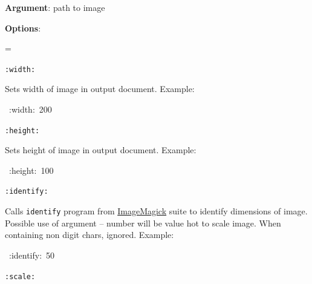\documentclass[12pt]{article}
\newenvironment{deflist}[1]{%
\begin{list}{}
{\renewcommand{\makelabel}[1]{\textbf{##1}\hfill}
\settowidth{\labelwidth}{\textbf{#1}}
\leftmargin=\labelwidth
\advance \leftmargin\labelsep}}
{\end{list}}
\begin{document}
\begin{itemize}
\item
\textbf{Argument}: path to image

\item
\textbf{Options}:

 \begin{deflist}{iii}

\item[ \texttt{:width:}]

Sets width of image in output document. Example:

\begin{ttfamily}\begin{flushleft}
\mbox{~:width:~200}\\
\end{flushleft}\end{ttfamily}

\item[ \texttt{:height:}]

Sets height of image in output document. Example:

\begin{ttfamily}\begin{flushleft}
\mbox{~:height:~100}\\
\end{flushleft}\end{ttfamily}

\item[ \texttt{:identify:}]

Calls \texttt{identify} program from \href{http://www.imagemagick.org}{ImageMagick} suite to identify
dimensions of image. Possible use of argument -- number will be value
hot to scale image. When containing non digit chars, ignored.
Example:

\begin{ttfamily}\begin{flushleft}
\mbox{~:identify:~50}\\
\end{flushleft}\end{ttfamily}

 \begin{center}
\end{center}

\item[ \texttt{:scale:}]


\end{deflist}
\end{itemize}
\end{document}
